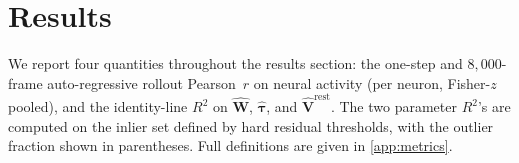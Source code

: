 \documentclass{article}
\begin{document}

\section{Results}


We report four quantities throughout the results section: the one-step and
$8{,}000$-frame auto-regressive rollout Pearson~$r$ on neural activity
(per neuron, Fisher-$z$ pooled), and the identity-line $R^2$ on
$\hat{\mathbf{W}}$, $\hat{\boldsymbol{\tau}}$, and
$\hat{\mathbf{V}}^{\mathrm{rest}}$. The two parameter $R^2$'s are
computed on the inlier set defined by hard residual thresholds, with
the outlier fraction shown in parentheses. Full definitions are given
in \cref{app:metrics}.
\end{document}
